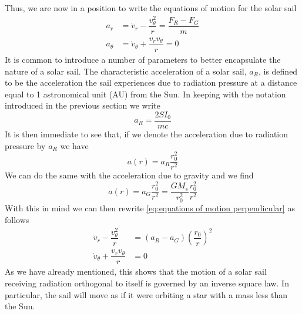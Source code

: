 \documentclass[twocolumn,12pt,a4paper]{article}
\numberwithin{equation}{section}
\begin{document}
Thus, we are now in a position to write the equations of motion for the solar sail
\begin{align}
	a_{r} &= \dot{v}_r - \dfrac{v_{\theta}^2}{r} = \dfrac{F_R - F_G}{m} \label{eq:equations of motion perpendicular} \\
	a_{\theta} &= \dot{v}_{\theta} + \dfrac{v_r v_{\theta}}{r} = 0 
\end{align}
It is common to introduce a number of parameters to better encapsulate the nature of a solar sail. The characteristic acceleration of a solar sail, \( a_R \), is defined to be the acceleration the sail experiences due to radiation pressure at a distance equal to 1 astronomical unit (AU) from the Sun. In keeping with the notation introduced in the previous section we write
\begin{equation}
  a_R = \dfrac{2SI_0}{mc}
\end{equation}
It is then immediate to see that, if we denote the acceleration due to radiation pressure by \( a_R \) we have
\begin{equation}
  a(r) = a_R \dfrac{r_0^2}{r^2} 
\end{equation}
We can do the same with the acceleration due to gravity and we find
\begin{equation}
  a(r) = a_G \dfrac{r_0^2}{r^2} = \dfrac{G M_s}{r_0^2} \dfrac{r_0^2}{r^2}
\end{equation}
With this in mind we can then rewrite \autoref{eq:equations of motion perpendicular} as follows
\begin{align} \label{eq:equations of motion characteristic accelerations}
  \dot{v}_r - \dfrac{v_{\theta}^2}{r} &= (a_R - a_G) \left(\dfrac{r_0}{r}\right)^2 \\
	\dot{v}_{\theta} + \dfrac{v_r v_{\theta}}{r} &= 0
\end{align}
As we have already mentioned, this shows that the motion of a solar sail receiving radiation orthogonal to itself is governed by an inverse square law. In particular, the sail will move as if it were orbiting a star with a mass less than the Sun.
\end{document}
